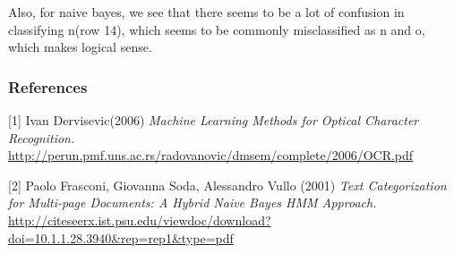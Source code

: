 \documentclass{article} %
\begin{document}
Also, for naive bayes, we see that there seems to be a lot of confusion in classifying n(row 14), which seems to be commonly misclassified as n and o, which makes logical sense. 



\subsubsection*{References}

\small{
[1] Ivan Dervisevic(2006) {\it Machine Learning Methods for Optical Character Recognition.} \url{http://perun.pmf.uns.ac.rs/radovanovic/dmsem/complete/2006/OCR.pdf}

[2] Paolo Frasconi, Giovanna Soda, Alessandro Vullo (2001) {\it Text Categorization for Multi-page Documents: A Hybrid Naive Bayes HMM Approach.} \url{http://citeseerx.ist.psu.edu/viewdoc/download?doi=10.1.1.28.3940&rep=rep1&type=pdf}
}
\end{document}
